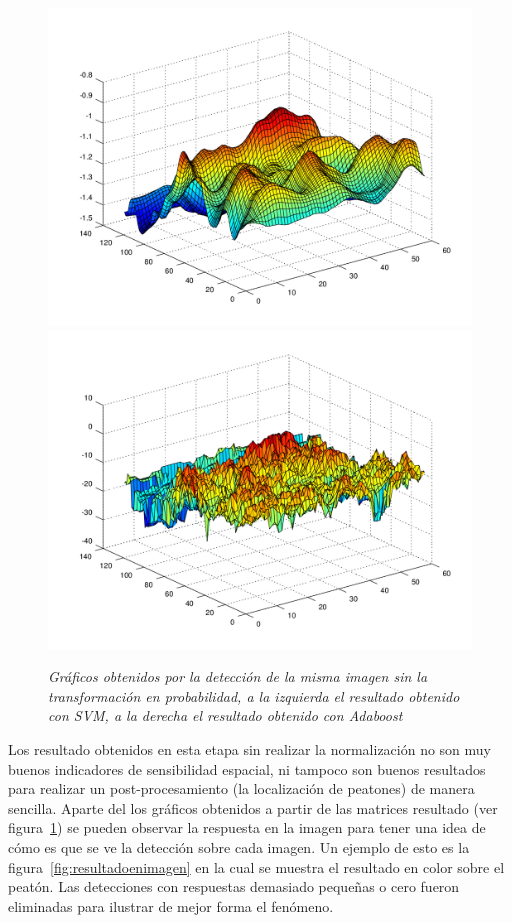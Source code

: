\begin{figure}[htc]
  \centering
  \includegraphics[scale=.3]{images/svmrawoutput}
  \includegraphics[scale=.3]{images/boostrawoutput}
  \caption{\em Gráficos obtenidos por la detección de la misma imagen sin la transformación en probabilidad, a la izquierda el resultado obtenido con SVM, a la derecha el resultado obtenido con Adaboost}  
  \label{fig:rawoutput}
\end{figure}


Los resultado obtenidos en esta etapa sin realizar la normalización no son muy buenos indicadores de sensibilidad espacial, ni tampoco son buenos resultados para realizar un post-procesamiento (la localización de peatones) de manera sencilla. Aparte del los gráficos obtenidos a partir de las matrices resultado (ver figura~\ref{fig:rawoutput}) se pueden observar la respuesta en la imagen para tener una idea de cómo es que se ve la detección sobre cada imagen. Un ejemplo de esto es la figura~\ref{fig:resultadoenimagen} en la cual se muestra el resultado en color sobre el peatón. Las detecciones con respuestas demasiado pequeñas o cero fueron eliminadas para ilustrar de mejor forma el fenómeno.

